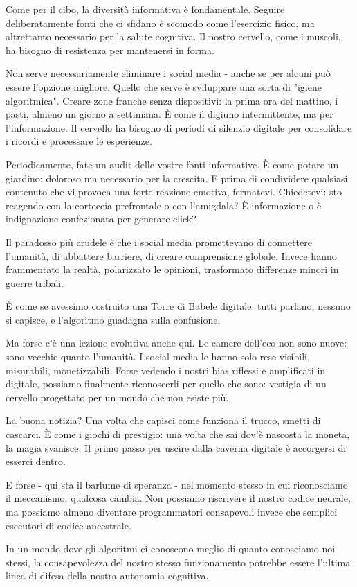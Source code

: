 Come per il cibo, la diversità informativa è fondamentale. Seguire deliberatamente fonti che ci sfidano è scomodo come l'esercizio fisico, ma altrettanto necessario per la salute cognitiva. Il nostro cervello, come i muscoli, ha bisogno di resistenza per mantenersi in forma. 

Non serve necessariamente eliminare i social media - anche se per alcuni può essere l'opzione migliore. Quello che serve è sviluppare una sorta di "igiene algoritmica". Creare zone franche senza dispositivi: la prima ora del mattino, i pasti, almeno un giorno a settimana. È come il digiuno intermittente, ma per l'informazione. Il cervello ha bisogno di periodi di silenzio digitale per consolidare i ricordi e processare le esperienze.

Periodicamente, fate un audit delle vostre fonti informative. È come potare un giardino: doloroso ma necessario per la crescita. E prima di condividere qualsiasi contenuto che vi provoca una forte reazione emotiva, fermatevi. Chiedetevi: sto reagendo con la corteccia prefrontale o con l'amigdala? È informazione o è indignazione confezionata per generare click?


Il paradosso più crudele è che i social media promettevano di connettere l'umanità, di abbattere barriere, di creare comprensione globale. Invece hanno frammentato la realtà, polarizzato le opinioni, trasformato differenze minori in guerre tribali.

È come se avessimo costruito una Torre di Babele digitale: tutti parlano, nessuno si capisce, e l'algoritmo guadagna sulla confusione.

Ma forse c'è una lezione evolutiva anche qui. Le camere dell'eco non sono nuove: sono vecchie quanto l'umanità. I social media le hanno solo rese visibili, misurabili, monetizzabili. Forse vedendo i nostri bias riflessi e amplificati in digitale, possiamo finalmente riconoscerli per quello che sono: vestigia di un cervello progettato per un mondo che non esiste più.


La buona notizia? Una volta che capisci come funziona il trucco, smetti di cascarci. È come i giochi di prestigio: una volta che sai dov'è nascosta la moneta, la magia svanisce. Il primo passo per uscire dalla caverna digitale è accorgersi di esserci dentro.

E forse - qui sta il barlume di speranza - nel momento stesso in cui riconosciamo il meccanismo, qualcosa cambia. Non possiamo riscrivere il nostro codice neurale, ma possiamo almeno diventare programmatori consapevoli invece che semplici esecutori di codice ancestrale.

In un mondo dove gli algoritmi ci conoscono meglio di quanto conosciamo noi stessi, la consapevolezza del nostro stesso funzionamento potrebbe essere l'ultima linea di difesa della nostra autonomia cognitiva. 